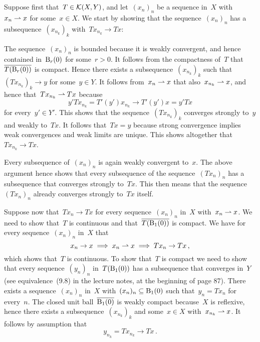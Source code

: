 \section{}

Suppose first that~$T \in \mathcal{K}(X,Y)$, and let~$(x_n)_n$ be a sequence in~$X$ with~$x_n \rightharpoonup x$ for some~$x \in X$.
We start by showing that the sequence~$(x_n)_n$ has a subsequence~$(x_{n_k})_k$ with~$T x_{n_k} \to T x$:

The sequence~$(x_n)_n$ is bounded because it is weakly convergent, and hence contained in~$\operatorname{B}_{r}(0)$ for some~$r > 0$.
It follows from the compactness of~$T$ that~$\overline{ T( \operatorname{B}_{r}(0) ) }$ is compact.
Hence there exists a subsequence~$(x_{n_k})_k$ such that~$( T x_{n_k} )_k \to y$ for some~$y \in Y$.
It follows from~$x_n \rightharpoonup x$ that also~$x_{n_k} \rightharpoonup x$, and hence that~$T x_{n_k} \rightharpoonup T x$ because
\[
  y' T x_{n_k}
  =
  T'(y') x_{n_k}
  \to
  T'(y') x
  =
  y' T x
\]
for every~$y' \in Y'$.
This shows that the sequence~$(T x_{n_k})_k$ converges strongly to~$y$ and weakly to~$T x$.
It follows that~$Tx = y$ because strong convergence implies weak convergences and weak limits are unique.
This shows altogether that~$T x_{n_k} \to T x$.

Every subsequence of~$(x_n)_n$ is again weakly convergent to~$x$.
The above argument hence shows that every subsequence of the sequence~$(T x_n)_n$ has a subsequence that converges strongly to~$T x$.
This then means that the sequence~$(T x_n)_n$ already converges strongly to~$T x$ itself.

Suppose now that~$T x_n \to Tx$ for every sequence~$(x_n)_n$ in~$X$ with~$x_n \rightharpoonup x$.
We need to show that~$T$ is continuous and that~$\overline{ T( \operatorname{B}_{1}(0) ) }$ is compact.
We have for every sequence~$(x_n)_n$ in~$X$ that
\[
  x_n \to x
  \implies
  x_n \rightharpoonup x
  \implies
  T x_n \to T x \,,
\]
which shows that~$T$ is continuous.
To show that~$T$ is compact we need to show that every sequence~$(y_n)_n$ in~$T( \operatorname{B}_{1}(0) )$ has a subsequence that converges in~$Y$ (see equivalence~(9.8) in the lecture notes, at the beginning of page 87).
There exists a sequence~$(x_n)_n$ in~$X$ with~$(x_n)_n \subseteq \operatorname{B}_{1}(0)$ such that~$y_n = T x_n$ for every~$n$.
The closed unit ball~$\overline{\operatorname{B}_{1}(0)}$ is weakly compact because~$X$ is reflexive, hence there exists a subsequence~$(x_{n_k})_k$ and some~$x \in X$ with~$x_{n_k} \rightharpoonup x$.
It follows by assumption that
\[
  y_{n_k}
  =
  T x_{n_k}
  \to
  T x \,.
\]




